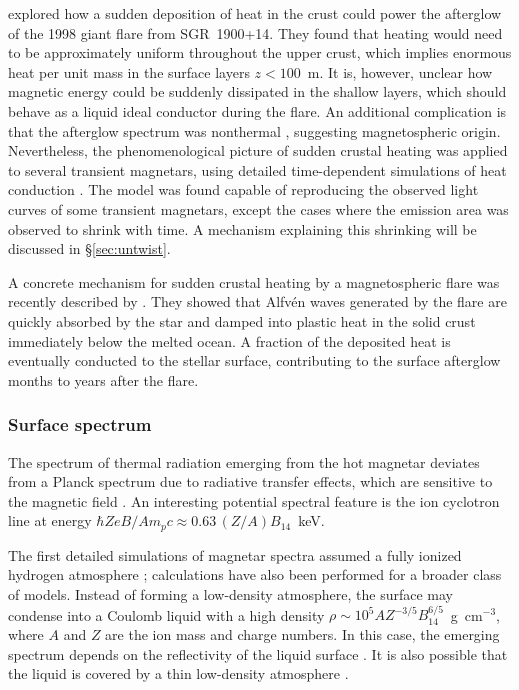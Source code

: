 \citet{let02}
explored how a sudden deposition of heat in the crust could power the 
afterglow of the 1998 giant flare from SGR~1900+14. They found that heating 
would need to be approximately uniform throughout the upper crust, which implies 
enormous heat per unit mass in the surface layers $z< 100$~m.
It is, however, unclear how magnetic energy could be 
suddenly dissipated in the shallow layers,
which should behave as a liquid ideal conductor during the flare.
An additional complication is that the afterglow spectrum was nonthermal \citep{wkg+01}, 
suggesting magnetospheric origin. 
Nevertheless, the phenomenological picture of sudden crustal heating was 
applied to several transient magnetars, using detailed time-dependent 
simulations of heat conduction \citep[e.g.][]{rip+13,skc14}. 
The model was found capable of reproducing the observed light curves of 
some transient magnetars, except the cases where the emission area was 
observed to shrink with time. A mechanism explaining this shrinking will
be discussed in \S\ref{sec:untwist}.

A concrete mechanism for sudden crustal heating by a magnetospheric flare
was recently described by \citet{lb15}. 
They showed that Alfv\'en waves generated by the flare are quickly absorbed by the star 
and damped into plastic heat in the solid crust immediately below the melted ocean. 
A fraction of the deposited heat is eventually conducted to the stellar surface, 
contributing to the surface afterglow months to years after the flare. 


\subsubsection{Surface spectrum}


The spectrum of thermal radiation emerging from the hot magnetar 
deviates from a Planck spectrum due to radiative transfer effects,
which are sensitive to the magnetic field \citep[see][for a review]{pdp15}.
An interesting potential spectral feature is the ion cyclotron line at energy
$\hbar ZeB/Am_pc\approx 0.63\,(Z/A)B_{14}$~keV.

The first detailed simulations of magnetar spectra assumed a fully ionized
hydrogen atmosphere \citep{hl01b,oze01,zts+01};
calculations have also been performed for a broader class of models.
Instead of forming a low-density atmosphere, the surface may
condense into a Coulomb liquid \citep{rud71,ml06} with a high density
$\rho\sim 10^5 AZ^{-3/5}B_{14}^{6/5}$~g~cm$^{-3}$, where $A$ and $Z$ are the 
ion mass and charge numbers. In this case, the emerging spectrum depends on the 
reflectivity of the liquid surface \citep{tzd04}.
It is also possible that the liquid is covered by a thin low-density atmosphere
\citep{spw09}.

